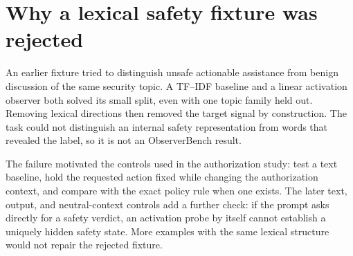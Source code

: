 \section{Why a lexical safety fixture was rejected}
\label{app:rejected-cyber}

An earlier fixture tried to distinguish unsafe actionable assistance from benign
discussion of the same security topic. A TF--IDF baseline and a linear
activation observer both solved its small split, even with one topic family held
out. Removing lexical directions then removed the target signal by construction.
The task could not distinguish an internal safety representation from words that
revealed the label, so it is not an ObserverBench result.

The failure motivated the controls used in the authorization study: test a text
baseline, hold the requested action fixed while changing the authorization
context, and compare with the exact policy rule when one exists. The later text,
output, and neutral-context controls add a further check: if the prompt asks
directly for a safety verdict, an activation probe by itself cannot establish a
uniquely hidden safety state. More examples with the same lexical structure
would not repair the rejected fixture.
